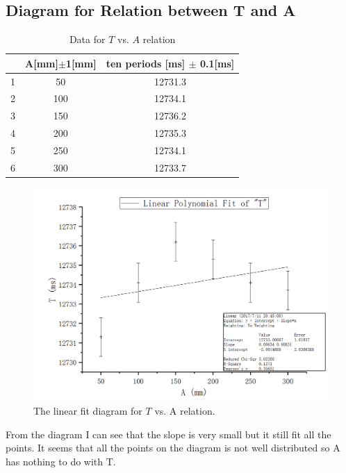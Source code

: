 \documentclass[12pt]{article}
\begin{document}
\subsection{Diagram for Relation between T and A}
\begin{table}[H]
\centering
\begin{tabular}{|c|c|c|}
\hline
  & A[mm]$\pm$1[mm] & ten periods [ms] $\pm$ 0.1[ms]\\ \hline
1 & 50    & 12731.3   \\ \hline
2 & 100      & 12734.1   \\ \hline
3 & 150     & 12736.2   \\ \hline
4 & 200      & 12735.3   \\ \hline
5 & 250     & 12734.1 \\ \hline
6 & 300      & 12733.7   \\ \hline
\end{tabular}
\caption{Data for $T$ vs. $A$ relation}
\end{table}
\begin{figure}[H]
\centering
\includegraphics[scale=0.4]{P11.jpg}
\caption{The linear fit diagram for $T$ vs. A relation.}
\end{figure}
From the diagram I can see that the slope is very small but it still fit all the points. It seems that all the points on the diagram is not well distributed so A has nothing to do with T.
\end{document}
